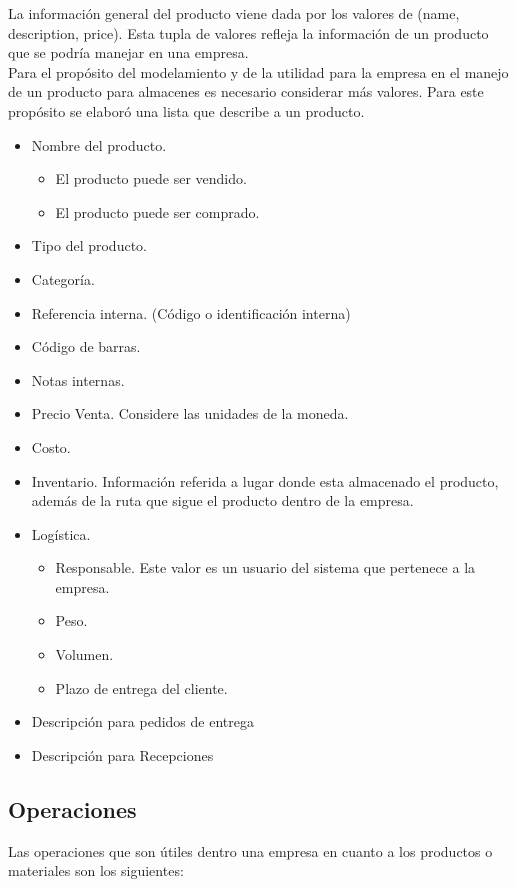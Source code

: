 La información general del producto viene dada por los valores de (name, description, price). Esta tupla de valores refleja la información de un producto que se podría manejar en una empresa.\\

Para el propósito del modelamiento y de la utilidad para la empresa en el manejo de un producto para almacenes es necesario considerar más valores. Para este propósito se elaboró una lista que describe a un producto.

\begin{itemize}
\item Nombre del producto.
\begin{itemize}
\item El producto puede ser vendido.
\item El producto puede ser comprado.
\end{itemize}
\item Tipo del producto.
\item Categoría.
\item Referencia interna. (Código o identificación interna)
\item Código de barras.
\item Notas internas.
\item Precio Venta. Considere las unidades de la moneda.
\item Costo.
\item Inventario. Información referida a lugar donde esta almacenado el producto, además de la ruta que sigue el producto dentro de la empresa.
\item Logística.
\begin{itemize}
\item Responsable. Este valor es un usuario del sistema que pertenece a la empresa.
\item Peso.
\item Volumen.
\item Plazo de entrega del cliente.
\end{itemize}
\item Descripción para pedidos de entrega
\item Descripción para Recepciones
\end{itemize}

\subsection{Operaciones}

Las operaciones que son útiles dentro una empresa en cuanto a los productos o materiales son los siguientes:

